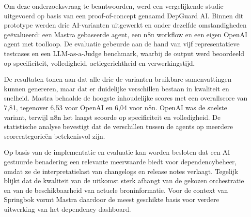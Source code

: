 Om deze onderzoeksvraag te beantwoorden, werd een vergelijkende studie uitgevoerd op basis van een proof-of-concept genaamd DepGuard AI. Binnen dit prototype werden drie AI-varianten uitgewerkt en onder dezelfde omstandigheden geëvalueerd: een Mastra gebaseerde agent, een n8n workflow en een eigen OpenAI agent met toolloop. De evaluatie gebeurde aan de hand van vijf representatieve testcases en een LLM-as-a-Judge benchmark, waarbij de output werd beoordeeld op specificiteit, volledigheid, actiegerichtheid en verwerkingstijd.

De resultaten tonen aan dat alle drie de varianten bruikbare samenvattingen kunnen genereren, maar dat er duidelijke verschillen bestaan in kwaliteit en snelheid. Mastra behaalde de hoogste inhoudelijke scores met een overallscore van 7,81, tegenover 6,53 voor OpenAI en 6,04 voor n8n. OpenAI was de snelste variant, terwijl n8n het laagst scoorde op specificiteit en volledigheid. De statistische analyse bevestigt dat de verschillen tussen de agents op meerdere scorecategorieën betekenisvol zijn.

Op basis van de implementatie en evaluatie kan worden besloten dat een AI gestuurde benadering een relevante meerwaarde biedt voor dependencybeheer, omdat ze de interpretatielast van changelogs en release notes verlaagt. Tegelijk blijkt dat de kwaliteit van de uitkomst sterk afhangt van de gekozen orchestratie en van de beschikbaarheid van actuele broninformatie. Voor de context van Springbok vormt Mastra daardoor de meest geschikte basis voor verdere uitwerking van het dependency-dashboard.


% 

